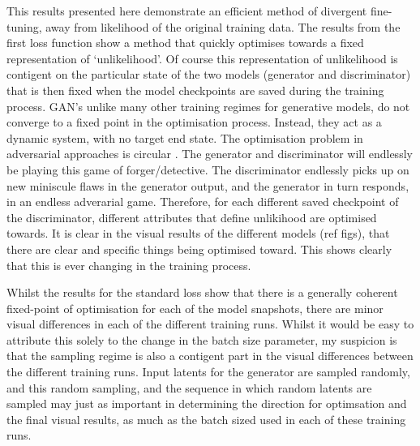 This results presented here demonstrate an efficient method of divergent fine-tuning, away from likelihood of the original training data. 
The results from the first loss function show a method that quickly optimises towards a fixed representation of `unlikelihood'.
Of course this representation of unlikelihood is contigent on the particular state of the two models (generator and discriminator) that is then fixed when the model checkpoints are saved during the training process.
GAN's unlike many other training regimes for generative models,  do not converge to a fixed point in the optimisation process.
Instead, they act as a dynamic system, with no target end state. 
The optimisation problem in adversarial approaches is circular \citep{nagarajan2017gradient}. 
The generator and discriminator will endlessly be playing this game of forger/detective. 
The discriminator endlessly picks up on new miniscule flaws in the generator output, and the generator in turn responds, in an endless adverarial game.
Therefore, for each different saved checkpoint of the discriminator, different attributes that define unlikihood are optimised towards.
It is clear in the visual results of the different models (ref figs), that there are clear and specific things being optimised toward.
This shows clearly that this is ever changing in the training process.

Whilst the results for the standard loss show that there is a generally coherent fixed-point of optimisation for each of the model snapshots, there are minor visual differences in each of the different training runs.
Whilst it would be easy to attribute this solely to the change in the batch size parameter, my suspicion is that the sampling regime is also a contigent part in the visual differences between the different training runs.
Input latents for the generator are sampled randomly, and this random sampling, and the sequence in which random latents are sampled may just as important in determining the direction for optimsation and the final visual results, as much as the batch sized used in each of these training runs. 

